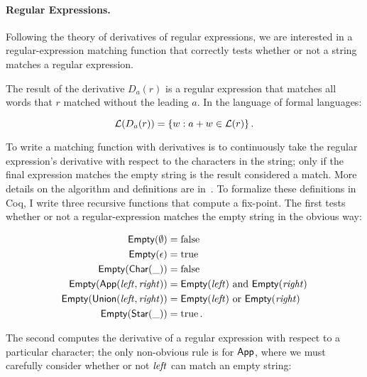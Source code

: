 \paragraph{Regular Expressions.} Following the theory of derivatives of regular
expressions, we are interested in a regular-expression matching function that
correctly tests whether or not a string matches a regular expression.

The result of the derivative \(D_a(r)\) is a regular expression that matches all
words that \(r\) matched without the leading \(a\). In the language of formal
languages:

\begin{equation*}
    \mathcal{L}(D_a(r)) = \left\{ w : a + w \in \mathcal{L}(r)\right\}.
\end{equation*}

To write a matching function with derivatives is to continuously take the
regular expression's derivative with respect to the characters in the string;
only if the final expression matches the empty string is the result considered a
match. More details on the algorithm and definitions are
in~\cite{Might_Yacc,Might_desugar,Might_deriv}. To formalize these definitions
in Coq, I write three recursive functions that compute a fix-point. The first
tests whether or not a regular-expression matches the empty string in the
obvious way:

\begin{align*}
    \mathsf{Empty}(\emptyset) &= \operatorname{false} \\
    \mathsf{Empty}(\epsilon) &= \operatorname{true} \\
    \mathsf{Empty}(\mathsf{Char}(\_)) &= \operatorname{false} \\
    \mathsf{Empty}(\mathsf{App}(\mathit{left}, \mathit{right})) &=
        \mathsf{Empty}(\mathit{left}) \text{ and } \mathsf{Empty}(\mathit{right}) \\
    \mathsf{Empty}(\mathsf{Union}(\mathit{left}, \mathit{right})) &=
        \mathsf{Empty}(\mathit{left}) \text{ or } \mathsf{Empty}(\mathit{right}) \\
    \mathsf{Empty}(\mathsf{Star}(\_)) &= \operatorname{true}.
\end{align*}

The second computes the derivative of a regular expression with respect to a
particular character; the only non-obvious rule is for \(\mathsf{App}\), where we
must carefully consider whether or not \(\mathit{left}\) can match an empty string:

